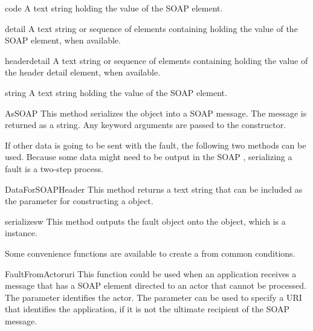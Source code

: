 \begin{memberdesc}{code}
A text string holding the value of the SOAP  element.
\end{memberdesc}

\begin{memberdesc}{detail}
A text string or sequence of elements containing holding the value of the
SOAP  element, when available.
\end{memberdesc}

\begin{memberdesc}{headerdetail}
A text string or sequence of elements containing holding the value of the
\ZSI{} header detail element, when available.
\end{memberdesc}

\begin{memberdesc}{string}
A text string holding the value of the SOAP  element.
\end{memberdesc}

\begin{methoddesc}{AsSOAP}{}
This method serializes the  object into a SOAP message.
The message is returned as a string.
Any keyword arguments are passed to the  constructor.
\end{methoddesc}

If other data is going to be sent with the fault, the following
two methods can be used.
Because some data might need to be output in the SOAP ,
serializing a fault is a two-step process.

\begin{methoddesc}{DataForSOAPHeader}{}
This method returns a text string that can be included as the
 parameter for constructing a  object.
\end{methoddesc}

\begin{methoddesc}{serialize}{sw}
This method outputs the fault object onto the  object, which is a
 instance.
\end{methoddesc}

Some convenience functions are available to create a 
from common conditions.

\begin{funcdesc}{FaultFromActor}{uri}
This function could be used when an application receives a message
that has a SOAP  element directed to an actor that
cannot be processed.
The  parameter identifies the actor.
The  parameter can be used to specify a URI that identifies the
application, if it is not the ultimate recipient of the SOAP message.
\end{funcdesc}

